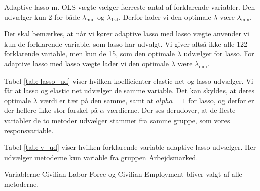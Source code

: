 Adaptive lasso m. OLS vægte vælger færreste antal af forklarende variabler. 
Den udvælger kun 2 for både   $\lambda_{\min}$ og $\lambda_{1\text{sd}}$. 
Derfor lader vi den optimale $\lambda$ være  $\lambda_{\min}$. 

Der skal bemærkes, at når vi kører adaptive lasso med lasso vægte anvender vi kun de forklarende variable, som lasso har udvalgt. 
Vi giver altså ikke alle 122 forklarende variable, men kun de 15, som den optimale $\lambda$ udvælger for lasso.
For adaptive lasso med lasso vægte lader vi den optimale $\lambda$ være $\lambda_{\min}$.  

Tabel \ref{tab: lasso_ud} viser hvilken koefficienter elastic net og lasso udvælger. 
Vi får at lasso og elastic net udvælger de samme variable. 
Det kan skyldes, at deres optimale $\lambda$ værdi er tæt på den samme, samt at $alpha = 1$ for lasso, og derfor er der hellere ikke stor forskel på $\alpha$-værdierne. 
Der ses derudover, at de fleste variabler de to metoder udvælger stammer fra samme gruppe, som vores responsvariable.  

Tabel \ref{tab: v_ud} viser hvilken forklarende variable adaptive lasso udvælger.  Her udvælger metoderne kun variable fra gruppen Arbejdsmarked. 

Variablerne Civilian Labor Force og Civilian Employment bliver valgt af alle metoderne. 



